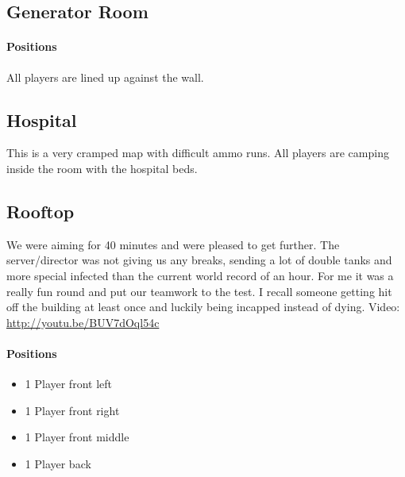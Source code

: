 \subsection{Generator Room}
\paragraph{Positions}
All players are lined up against the wall.

\subsection{Hospital}
This is a very cramped map with difficult ammo runs. All players are camping inside the room with the hospital beds.

\subsection{Rooftop}
We were aiming for 40 minutes and were pleased to get further. The server/director was not giving us any breaks, sending a lot of double tanks and more special infected than the current world record of an hour. For me it was a really fun round and put our teamwork to the test. I recall someone getting hit off the building at least once and luckily being incapped instead of dying. Video: \url{http://youtu.be/BUV7dOql54c}

\paragraph{Positions}
\begin{itemize}
\item 1 Player front left
\item 1 Player front right
\item 1 Player front middle
\item 1 Player back
\end{itemize}

